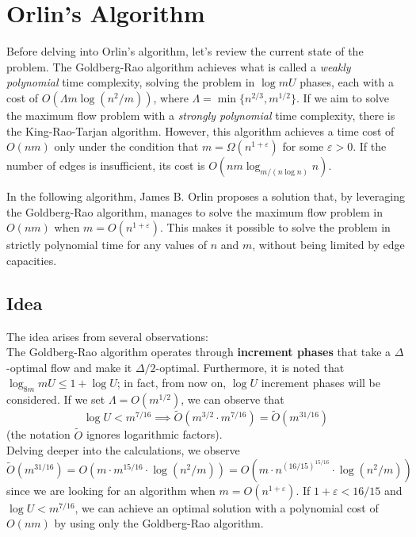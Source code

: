 
\chapter{Orlin's Algorithm} \label{chap:Orlin}

    Before delving into Orlin's algorithm, let's review the current state of the problem.  
    The Goldberg-Rao algorithm achieves what is called a \textit{weakly polynomial} time complexity, solving the problem in \(\log mU\) phases, each with a cost of \( O(\Lambda m \log(n^2/m)) \), where \( \Lambda = \min \{n^{2/3}, m^{1/2}\} \).  
    If we aim to solve the maximum flow problem with a \textit{strongly polynomial} time complexity, there is the King-Rao-Tarjan algorithm. However, this algorithm achieves a time cost of \( O(nm) \) only under the condition that \( m = \Omega (n^{1+\varepsilon}) \) for some \( \varepsilon > 0 \).  
    If the number of edges is insufficient, its cost is \( O(nm \log_{m / (n \log n)} n) \).  

    In the following algorithm, James B. Orlin proposes a solution that, by leveraging the Goldberg-Rao algorithm, manages to solve the maximum flow problem in \( O(nm) \) when \( m = O(n^{1+\varepsilon}) \). This makes it possible to solve the problem in strictly polynomial time for any values of \( n \) and \( m \), without being limited by edge capacities.


\section{Idea}

    The idea arises from several observations:\\
    The Goldberg-Rao algorithm operates through \textbf{increment phases} that take a \(\Delta\)-optimal flow and make it \(\Delta/2\)-optimal.  
    Furthermore, it is noted that \(\log_{8m} mU \leq 1 + \log U\); in fact, from now on, \(\log U\) increment phases will be considered.  
    If we set \(\Lambda = O(m^{1/2})\), we can observe that  
    \[
    \log U < m^{7/16} \implies \tilde{O}(m^{3/2} \cdot m^{7/16}) = \tilde{O}(m^{31/16})
    \]
    (the notation \(\tilde{O}\) ignores logarithmic factors).\\
    Delving deeper into the calculations, we observe  
    \[
    \tilde{O}(m^{31/16}) = O(m \cdot m^{15/16} \cdot \log(n^2/m)) = O(m \cdot n^{(16/15)^{15/16}} \cdot \log(n^2/m))
    \]
    since we are looking for an algorithm when \(m = O(n^{1+\varepsilon})\). If \(1+\varepsilon < 16/15\) and \(\log U < m^{7/16}\), we can achieve an optimal solution with a polynomial cost of \(O(nm)\) by using only the Goldberg-Rao algorithm.

